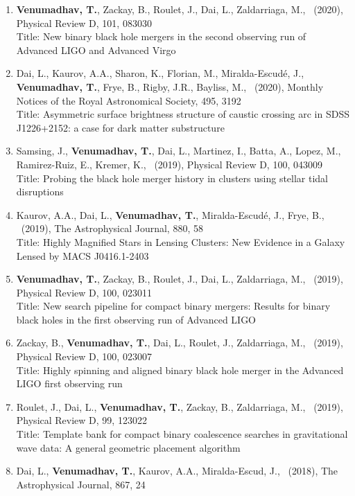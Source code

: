 \documentclass{article}
\newlength{\cvindent}
\newenvironment{cvlist}{%
  \begin{list}{}{%
    \setlength{\leftmargin}{\cvindent}%
    \setlength{\rightmargin}{0pt}%
    \setlength{\topsep}{0pt}%
    \setlength{\partopsep}{0pt}%
    \setlength{\parsep}{0pt}%
    \setlength{\itemsep}{0pt}%
  }%
  \item\relax
}{%
  \end{list}
}
\begin{document}
\begin{cvlist}
\begin{enumerate}[leftmargin=*,itemsep=0.32em,topsep=0.3em]
Title: Source properties of the lowest signal-to-noise-ratio binary black hole detections
\item \textbf{Venumadhav, T.}, Zackay, B., Roulet, J., Dai, L., Zaldarriaga, M., \ (2020), Physical Review D, 101, 083030 \\
Title: New binary black hole mergers in the second observing run of Advanced LIGO and Advanced Virgo
\item Dai, L., Kaurov, A.A., Sharon, K., Florian, M., Miralda-Escudé, J., \textbf{Venumadhav, T.}, Frye, B., Rigby, J.R., Bayliss, M., \ (2020), Monthly Notices of the Royal Astronomical Society, 495, 3192 \\
Title: Asymmetric surface brightness structure of caustic crossing arc in SDSS J1226+2152: a case for dark matter substructure
\item Samsing, J., \textbf{Venumadhav, T.}, Dai, L., Martinez, I., Batta, A., Lopez, M., Ramirez-Ruiz, E., Kremer, K., \ (2019), Physical Review D, 100, 043009 \\
Title: Probing the black hole merger history in clusters using stellar tidal disruptions
\item Kaurov, A.A., Dai, L., \textbf{Venumadhav, T.}, Miralda-Escudé, J., Frye, B., \ (2019), The Astrophysical Journal, 880, 58 \\
Title: Highly Magnified Stars in Lensing Clusters: New Evidence in a Galaxy Lensed by MACS J0416.1-2403
\item \textbf{Venumadhav, T.}, Zackay, B., Roulet, J., Dai, L., Zaldarriaga, M., \ (2019), Physical Review D, 100, 023011 \\
Title: New search pipeline for compact binary mergers: Results for binary black holes in the first observing run of Advanced LIGO
\item Zackay, B., \textbf{Venumadhav, T.}, Dai, L., Roulet, J., Zaldarriaga, M., \ (2019), Physical Review D, 100, 023007 \\
Title: Highly spinning and aligned binary black hole merger in the Advanced LIGO first observing run
\item Roulet, J., Dai, L., \textbf{Venumadhav, T.}, Zackay, B., Zaldarriaga, M., \ (2019), Physical Review D, 99, 123022 \\
Title: Template bank for compact binary coalescence searches in gravitational wave data: A general geometric placement algorithm
\item Dai, L., \textbf{Venumadhav, T.}, Kaurov, A.A., Miralda-Escud, J., \ (2018), The Astrophysical Journal, 867, 24 \\

\end{enumerate}
\end{cvlist}
\end{document}
